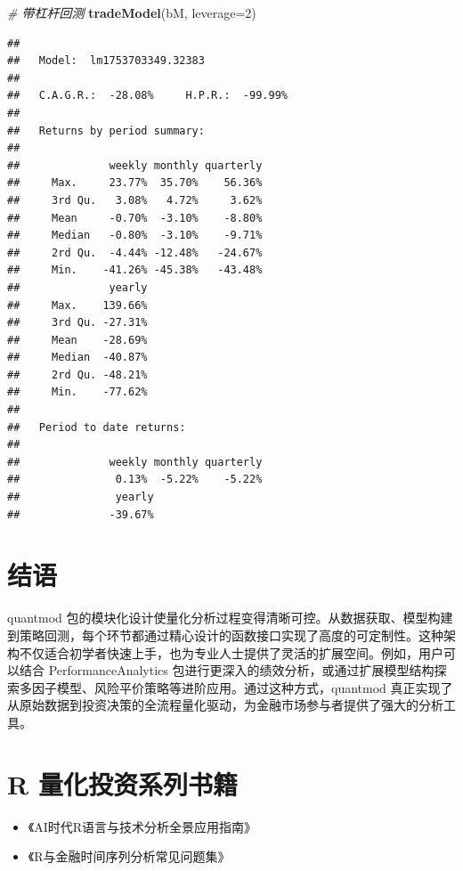 \documentclass[]{ctexbook}
\newenvironment{Shaded}{\begin{snugshade}}{\end{snugshade}}
\newcommand{\AttributeTok}[1]{\textcolor[rgb]{0.13,0.29,0.53}{#1}}
\newcommand{\CommentTok}[1]{\textcolor[rgb]{0.56,0.35,0.01}{\textit{#1}}}
\newcommand{\DecValTok}[1]{\textcolor[rgb]{0.00,0.00,0.81}{#1}}
\newcommand{\FunctionTok}[1]{\textcolor[rgb]{0.13,0.29,0.53}{\textbf{#1}}}
\newcommand{\NormalTok}[1]{#1}
\providecommand{\tightlist}{%
  \setlength{\itemsep}{0pt}\setlength{\parskip}{0pt}}
\begin{document}
\begin{Shaded}
\begin{Highlighting}[]
\CommentTok{\# 带杠杆回测}
\FunctionTok{tradeModel}\NormalTok{(bM, }\AttributeTok{leverage=}\DecValTok{2}\NormalTok{)}
\end{Highlighting}
\end{Shaded}

\begin{verbatim}
## 
##   Model:  lm1753703349.32383 
## 
##   C.A.G.R.:  -28.08%     H.P.R.:  -99.99% 
## 
##   Returns by period summary:
## 
##              weekly monthly quarterly
##     Max.     23.77%  35.70%    56.36%
##     3rd Qu.   3.08%   4.72%     3.62%
##     Mean     -0.70%  -3.10%    -8.80%
##     Median   -0.80%  -3.10%    -9.71%
##     2rd Qu.  -4.44% -12.48%   -24.67%
##     Min.    -41.26% -45.38%   -43.48%
##              yearly
##     Max.    139.66%
##     3rd Qu. -27.31%
##     Mean    -28.69%
##     Median  -40.87%
##     2rd Qu. -48.21%
##     Min.    -77.62%
## 
##   Period to date returns:
## 
##              weekly monthly quarterly
##               0.13%  -5.22%    -5.22%
##               yearly
##              -39.67%
\end{verbatim}

\chapter*{结语}\label{conclusion}


quantmod 包的模块化设计使量化分析过程变得清晰可控。从数据获取、模型构建到策略回测，每个环节都通过精心设计的函数接口实现了高度的可定制性。这种架构不仅适合初学者快速上手，也为专业人士提供了灵活的扩展空间。例如，用户可以结合 PerformanceAnalytics 包进行更深入的绩效分析，或通过扩展模型结构探索多因子模型、风险平价策略等进阶应用。通过这种方式，quantmod 真正实现了从原始数据到投资决策的全流程量化驱动，为金融市场参与者提供了强大的分析工具。

\cleardoublepage

\appendix {}


\chapter{R 量化投资系列书籍}\label{quantbooks}

\begin{itemize}
\tightlist
\item
  《AI时代R语言与技术分析全景应用指南》
\item
  《R与金融时间序列分析常见问题集》
\end{itemize}
\end{document}

